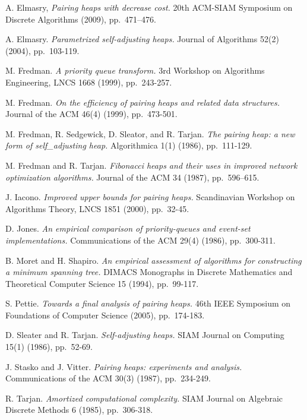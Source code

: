 \begin{thebibliography}{99}


A. Elmasry, {\em Pairing heaps with  decrease cost.} 
20th ACM-SIAM Symposium on Discrete Algorithms (2009), pp.~471--476.

 A. Elmasry. {\em Parametrized self-adjusting heaps.} 
Journal of Algorithms 52(2) (2004), pp.~103-119.

 M. Fredman. {\em A priority queue transform.} 3rd Workshop on Algorithms Engineering, LNCS 1668 (1999), pp.~243-257. 

 M. Fredman. {\em On the efficiency of pairing heaps and related data structures.} Journal of the ACM 46(4) (1999), pp.~473-501.

 M. Fredman, R. Sedgewick, D. Sleator, and R. Tarjan. {\em The pairing heap: a new form of self\_adjusting heap.} Algorithmica 1(1) (1986), pp.~111-129.

M. Fredman and R. Tarjan. {\em Fibonacci heaps and their uses in improved network optimization algorithms.} Journal of the ACM 34 (1987), pp.~596--615.

 J. Iacono. {\em Improved upper bounds for pairing heaps.} Scandinavian Workshop on Algorithms Theory, LNCS 1851 (2000), pp.~32-45. 

 D. Jones. {\em An empirical comparison of priority-queues and event-set implementations.} Communications of the ACM 29(4) (1986), pp.~300-311.

 B. Moret and H. Shapiro. {\em An empirical assessment of algorithms for constructing a minimum spanning tree.} DIMACS Monographs in Discrete Mathematics and Theoretical Computer Science 15 (1994), pp.~99-117.

 S. Pettie. {\em Towards a final analysis of pairing heaps.}
46th IEEE Symposium on Foundations of Computer Science (2005), pp.~174-183.

 D. Sleater and R. Tarjan. {\em Self-adjusting heaps.} SIAM Journal on Computing 15(1) (1986), pp.~52-69.

 J. Stasko and J. Vitter. {\em Pairing heaps: experiments and analysis.} Communications of the ACM 30(3) (1987), pp.~234-249.

 R. Tarjan. {\em Amortized computational complexity.} SIAM Journal on Algebraic Discrete Methods 6 (1985), pp.~306-318.


\end{thebibliography} 



